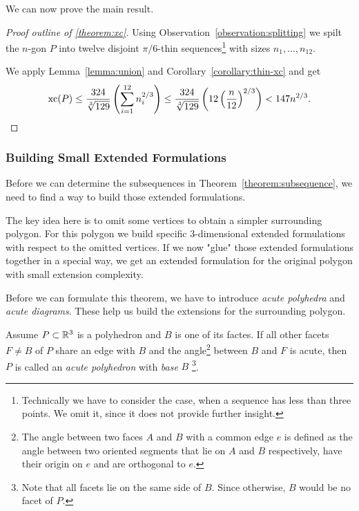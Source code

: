 We can now prove the main result.

\begin{proof}[Proof outline of \ref{theorem:xc}]
  Using Observation~\ref{observation:splitting} we spilt the $n$-gon $P$ into twelve disjoint $\pi/6$-thin sequences\footnote{Technically we have to consider the case, when a sequence has less than three points. We omit it, since it does not provide further insight.} with sizes $n_1,\dots,n_{12}$.

  We apply Lemma~\ref{lemma:union} and Corollary~\ref{corollary:thin-xc} and get $$\operatorname{xc}(P)\leq\frac{324}{\sqrt[3]{129}}\left(\sum\limits_{i=1}^{12}n_i^{2/3}\right)\leq\frac{324}{\sqrt[3]{129}}\left(12\left(\frac{n}{12}\right)^{2/3}\right) < 147 n^{2/3} .$$
\end{proof}



\subsubsection{Building Small Extended Formulations}

Before we can determine the subsequences in Theorem~\ref{theorem:subsequence}, we need to find a way to build those extended formulations.

The key idea here is to omit some vertices to obtain a simpler surrounding polygon. For this polygon we build specific 3-dimensional extended formulations with respect to the omitted vertices. If we now "glue" those extended formulations together in a special way, we get an extended formulation for the original polygon with small extension complexity.

Before we can formulate this theorem, we have to introduce \emph{acute polyhedra} and \emph{acute diagrams}. These help us build the extensions for the surrounding polygon.

\begin{definition}\label{definition:acute-polyhedron}
  Assume $P \subset \mathbb{R}^3$ is a polyhedron and $B$ is one of its factes. If all other facets $F \neq B$ of $P$ 
  share an edge with $B$ and
  the angle\footnote{The angle between two faces $A$ and $B$ with a common edge $e$ is defined as the angle between two oriented segments that lie on $A$ and $B$ respectively, have their origin on $e$ and are orthogonal to $e$.} between $B$ and $F$ is acute,
  then $P$ is called an \emph{acute polyhedron} with \emph{base} $B$ \footnote{Note that all facets lie on the same side of $B$. Since otherwise, $B$ would be no facet of $P$.}.
\end{definition}

